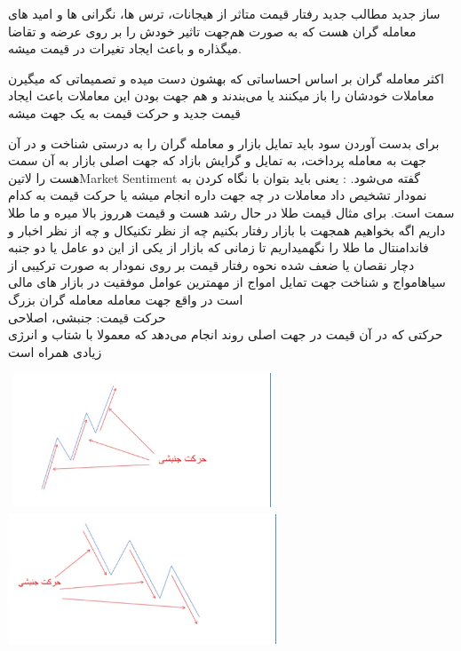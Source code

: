 \documentclass{article}
\begin{document}
	‌ساز
	‌جدید
	‌مطالب
	‌جدید
			رفتار قیمت متاثر از هیجانات، ترس ها، نگرانی ها و امید های معامله گران هست که به صورت هم‌جهت تاثیر خودش را بر روی عرضه و تقاضا میگذاره و باعث ایجاد تغیرات در قیمت میشه.
			
			اکثر معامله گران بر اساس احساساتی که بهشون دست میده و تصمیماتی که میگیرن معاملات خودشان را باز میکنند یا می‌بندند و هم جهت بودن این معاملات باعث ایجاد قیمت جدید و حرکت قیمت به یک جهت میشه
			
			 برای بدست آوردن سود باید تمایل بازار و معامله گران را به درستی شناخت و در آن جهت به معامله پرداخت، به تمایل و گرایش بازاد که جهت اصلی بازار به آن سمت هست را ‌لاتین{Market Sentiment} گفته می‌شود.  
			: یعنی باید بتوان با نگاه کردن به نمودار تشخیص داد معاملات در چه جهت داره انجام میشه یا حرکت قیمت به کدام سمت است.
			برای مثال قیمت طلا در حال رشد هست و قیمت هرروز بالا میره و ما طلا داریم اگه بخواهیم همجهت با بازار رفتار بکنیم چه از نظر تکنیکال و چه از نظر اخبار و فاندامنتال ما طلا را نگهمیداریم تا زمانی که بازار از یکی از این دو عامل یا دو جنبه دچار نقصان یا ضعف شده
		نحوه رفتار قیمت بر روی نمودار به صورت ترکیبی از ‌سیاه{امواج} و شناخت جهت تمایل امواج از مهمترین عوامل موفقیت در بازار های مالی است در واقع جهت معامله معامله گران بزرگ\\
		حرکت قیمت: جنبشی، اصلاحی\\
		 حرکتی که در آن قیمت در جهت اصلی روند انجام می‌دهد که معمولا با شتاب و انرژی زیادی همراه است
		
		
		\includegraphics[width=8cm, height=4cm]{pics/حرکت جنبشی.png}
				\includegraphics[width=8cm, height=4cm]{pics/حرکت جنبشی نزولی.png}
		
\end{document}
